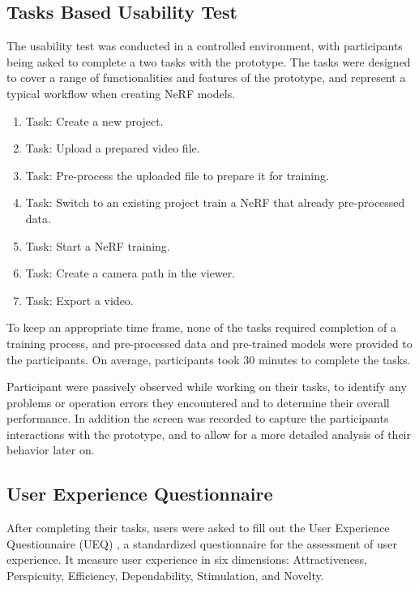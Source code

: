 \subsection{Tasks Based Usability Test}
\label{sec:methodology:study:tasks}

The usability test was conducted in a controlled environment, with participants being asked to complete a two tasks with the prototype.
The tasks were designed to cover a range of functionalities and features of the prototype, and represent a typical workflow when creating NeRF models.

\begin{enumerate}
  \item Task: Create a new project.
  \item Task: Upload a prepared video file.
  \item Task: Pre-process the uploaded file to prepare it for training.
  \item Task: Switch to an existing project train a NeRF that already pre-processed data.
  \item Task: Start a NeRF training.
  \item Task: Create a camera path in the viewer.
  \item Task: Export a video.
\end{enumerate}

To keep an appropriate time frame, none of the tasks required completion of a training process, and pre-processed data and pre-trained models were provided to the participants.
On average, participants took 30 minutes to complete the tasks. %

Participant were passively observed while working on their tasks, to identify any problems or operation errors they encountered and to determine their overall performance.
In addition the screen was recorded to capture the participants interactions with the prototype, and to allow for a more detailed analysis of their behavior later on.

\subsection{User Experience Questionnaire}
\label{sec:methodology:study:ueq}

After completing their tasks, users were asked to fill out the User Experience Questionnaire (UEQ) \cite{ueq}, a standardized questionnaire for the assessment of user experience.
It measure user experience in six dimensions: Attractiveness, Perspicuity, Efficiency, Dependability, Stimulation, and Novelty.

